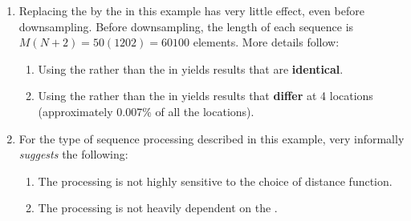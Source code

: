 \begin{example}
\begin{enumerate}
  \item \label{item:wrdie_hp_R3_euclid}
        Replacing the  by the  in this example
        has very little effect, even before downsampling.
        Before downsampling, the length of each sequence is $M(N+2)=50(1202)=60100$ elements.
        More details follow:
        \begin{enumerate}
          \item Using the  rather than the  
                in  yields results that are 
                \textbf{identical}. %

          \item \label{item:wrdie_hp_R3_hann50_euclid}
                Using the  rather than the  
                in 
                yields results that \textbf{differ} at 4 locations 
                (approximately 0.007\% of all the locations). %

        \end{enumerate}

  \item For the type of sequence processing described in this example, 
          very informally \emph{suggests} the following:
          \begin{enumerate}
            \item The processing is not highly sensitive to the choice of distance function.
            \item The processing is not heavily dependent on the .
          \end{enumerate}
\end{enumerate}
\end{example}

